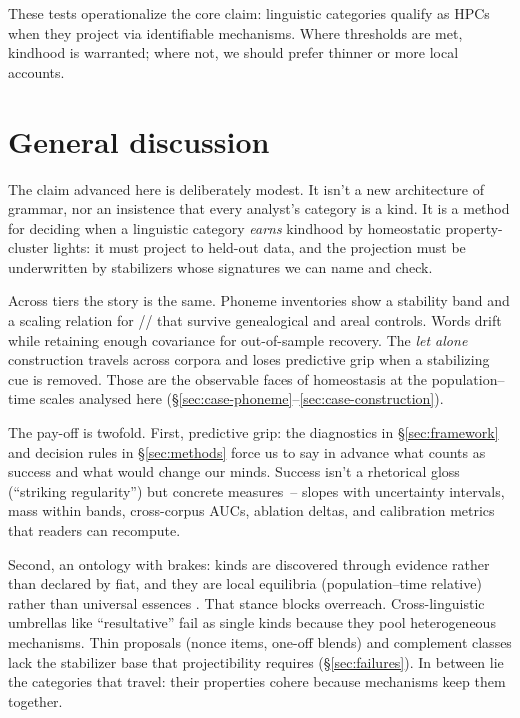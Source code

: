 \documentclass[12pt]{article}
\begin{document}
These tests operationalize the core claim: linguistic categories qualify as HPCs when they project via identifiable mechanisms. Where thresholds are met, kindhood is warranted; where not, we should prefer thinner or more local accounts.


\section{General discussion}\label{sec:discussion}

The claim advanced here is deliberately modest. It isn't a new architecture of grammar, nor an insistence that every analyst's category is a kind. It is a method for deciding when a linguistic category \textit{earns} kindhood by homeostatic property-cluster lights: it must project to held-out data, and the projection must be underwritten by stabilizers whose signatures we can name and check.

Across tiers the story is the same. Phoneme inventories show a stability band and a scaling relation for // that survive genealogical and areal controls. Words drift while retaining enough covariance for out-of-sample recovery. The \textit{let alone} construction travels across corpora and loses predictive grip when a stabilizing cue is removed. Those are the observable faces of homeostasis at the population–time scales analysed here (\S\ref{sec:case-phoneme}--\ref{sec:case-construction}).

The pay-off is twofold. First, predictive grip: the diagnostics in \S\ref{sec:framework} and decision rules in \S\ref{sec:methods} force us to say in advance what counts as success and what would change our minds. Success isn't a rhetorical gloss (\enquote{striking regularity}) but concrete measures~-- slopes with uncertainty intervals, mass within bands, cross-corpus AUCs, ablation deltas, and calibration metrics that readers can recompute.

Second, an ontology with brakes: kinds are discovered through evidence rather than declared by fiat, and they are local equilibria (population–time relative) rather than universal essences \citep{Boyd1991Enthusiasm,Boyd1999Homeostasis}. That stance blocks overreach. Cross-linguistic umbrellas like \enquote{resultative} fail as single kinds because they pool heterogeneous mechanisms. Thin proposals (nonce items, one-off blends) and complement classes lack the stabilizer base that projectibility requires (\S\ref{sec:failures}). In between lie the categories that travel: their properties cohere because mechanisms keep them together.
\end{document}
